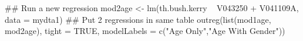 \begin{Schunk}
\begin{Sinput}
 ## Run a new regression
 mod2age <- lm(th.bush.kerry ~ V043250 + V041109A, data = mydta1)
 ## Put 2 regressions in same table
 outreg(list(mod1age, mod2age), tight = TRUE, modelLabels = c("Age Only","Age With Gender"))
\end{Sinput}
\end{Schunk}
